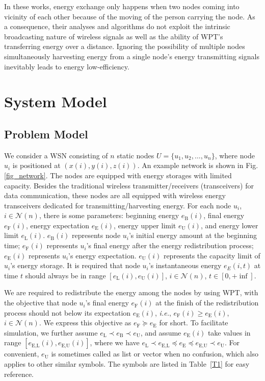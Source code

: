 \documentclass[journal,10pt]{IEEEtran}
\begin{document}
In these works, energy exchange only happens when two nodes coming into vicinity of each other because of the moving of the person carrying the node. As a consequence, their analyses and algorithms do not exploit the intrinsic broadcasting nature of wireless signals as well as the ability of WPT's transferring energy over a distance. Ignoring the possibility of multiple nodes simultaneously harvesting energy from a single node's energy transmitting signals inevitably leads to energy low-efficiency.


\section{System Model}
\label{sec_model}
\subsection{Problem Model}

We consider a WSN consisting of $n$ static nodes $U{=}\{u_1, u_2, \ldots, u_n\}$, where node $u_i$ is positioned at $(x(i),y(i),z(i))$. An example network is shown in Fig.\ref{fig_network}. The nodes are equipped with energy storages with limited capacity. Besides the traditional wireless transmitter/receivers (transceivers) for data communication, these nodes are all equipped with wireless energy transceivers dedicated for transmitting/harvesting energy. For each node $u_i$, $i{\in}\mathcal{N}(n)$, there is some parameters: beginning energy $e_\text{B}(i)$, final energy $e_\text{F}(i)$, energy expectation $e_\text{E}(i)$, energy upper limit $e_\text{U}(i)$, and energy lower limit $e_\text{L}(i)$. $e_\text{B}(i)$ represents node $u_i$'s initial energy amount at the beginning time; $e_\text{F}(i)$ represents $u_i$'s final energy after the energy redistribution process; $e_\text{E}(i)$ represents $u_i$'s energy expectation. $e_\text{U}(i)$ represents the capacity limit of $u_i$'s energy storage. It is required that node $u_i$'s instantaneous energy $e_{E}(i,t)$ at time $t$ should always be in range $[e_\text{L}(i),e_\text{U}(i)]$, $i{\in}\mathcal{N}(n)$, $t{\in}[0,{+}\inf]$.

We are required to redistribute the energy among the nodes by using WPT, with the objective that node $u_i$'s final energy $e_\text{F}(i)$ at the finish of the redistribution process should not below its expectation $e_\text{E}(i)$, \textit{i.e.}, $e_\text{F}(i){\geq}e_\text{E}(i)$, $i{\in}\mathcal{N}(n)$. We express this objective as $e_\text{F}{\succeq}e_\text{E}$ for short. To facilitate simulation, we further assume $e_\text{L}{\prec}e_\text{B}{\prec}e_\text{U}$, and assume $e_\text{E}(i)$ take values in range $[e_\text{E,L}(i),e_\text{E,U}(i)]$, where we have $e_\text{L}{\prec}e_\text{E,L}{\preceq}e_\text{E}{\preceq}e_\text{E,U}{\prec}e_\text{U}$. For convenient, $e_\text{U}$ is sometimes called as list or vector when no confusion, which also applies to other similar symbols. The symbols are listed in Table~\ref{T1} for easy reference.
\end{document}
